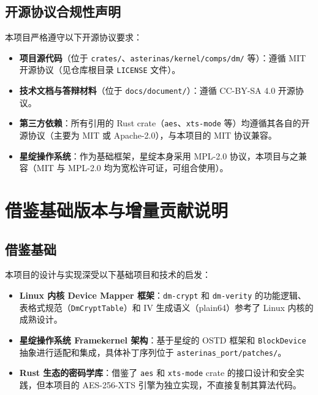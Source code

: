 \subsection{开源协议合规性声明}

本项目严格遵守以下开源协议要求：

\begin{itemize}
    \item \textbf{项目源代码}（位于 \texttt{crates/}、\texttt{asterinas/\allowbreak kernel/\allowbreak comps/\allowbreak dm/} 等）：遵循 MIT 开源协议（见仓库根目录 \texttt{LICENSE} 文件）。
    \item \textbf{技术文档与答辩材料}（位于 \texttt{docs/\allowbreak document/}）：遵循 CC-BY-SA 4.0 开源协议。
    \item \textbf{第三方依赖}：所有引用的 Rust crate（\texttt{aes}、\texttt{xts-mode} 等）均遵循其各自的开源协议（主要为 MIT 或 Apache-2.0），与本项目的 MIT 协议兼容。
    \item \textbf{星绽操作系统}：作为基础框架，星绽本身采用 MPL-2.0 协议，本项目与之兼容（MIT 与 MPL-2.0 均为宽松许可证，可组合使用）。
\end{itemize}

\section{借鉴基础版本与增量贡献说明}

\subsection{借鉴基础}

本项目的设计与实现深受以下基础项目和技术的启发：

\begin{itemize}
    \item \textbf{Linux 内核 Device Mapper 框架}：\texttt{dm-crypt} 和 \texttt{dm-verity} 的功能逻辑、表格式规范（\texttt{DmCryptTable}）和 IV 生成语义（plain64）参考了 Linux 内核的成熟设计。
    \item \textbf{星绽操作系统 Framekernel 架构}：基于星绽的 OSTD 框架和 \texttt{BlockDevice} 抽象进行适配和集成，具体补丁序列位于 \texttt{asterinas\_\allowbreak port/\allowbreak patches/}。
    \item \textbf{Rust 生态的密码学库}：借鉴了 \texttt{aes} 和 \texttt{xts-mode} crate 的接口设计和安全实践，但本项目的 AES-256-XTS 引擎为独立实现，不直接复制其算法代码。
\end{itemize}

